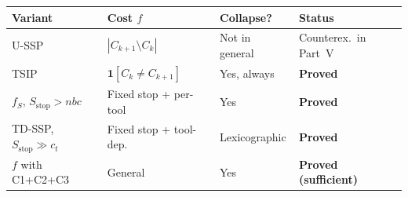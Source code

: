 \documentclass[11pt,a4paper]{article}
\theoremstyle{plain}
\theoremstyle{definition}
\begin{document}
\begin{center}
\begin{tabular}{llll}
\toprule
Variant & Cost $f$ & Collapse? & Status \\
\midrule
U-SSP & $|C_{k+1}\setminus C_k|$ & Not in general & Counterex.\ in Part~V \\
TSIP & $\mathbf{1}[C_k\ne C_{k+1}]$ & Yes, always & \textbf{Proved} \\
$f_S$, $S_\mathrm{stop}>nbc$ & Fixed stop + per-tool & Yes & \textbf{Proved} \\
TD-SSP, $S_\mathrm{stop}\gg c_t$ & Fixed stop + tool-dep. & Lexicographic & \textbf{Proved} \\
$f$ with C1+C2+C3 & General & Yes & \textbf{Proved (sufficient)} \\
\bottomrule
\end{tabular}
\end{center}



\end{document}
